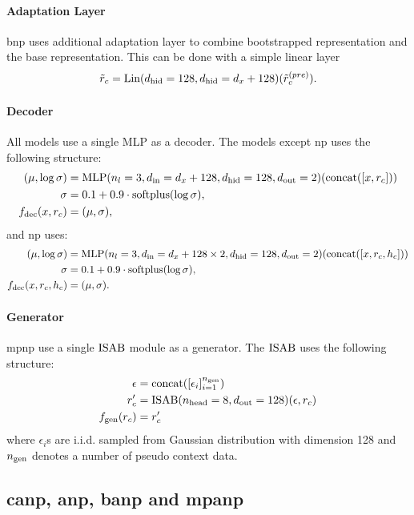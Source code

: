 \paragraph{Adaptation Layer}
\gls{bnp} uses additional adaptation layer to combine bootstrapped representation and the base representation. This can be done with a simple linear layer
\[
    \tilde{r}_c = \text{Lin}(d_{\text{hid}}=128, d_{\text{hid}}=d_x+128)(\tilde{r}_c^{(pre)}).
\]

\paragraph{Decoder}
All models use a single MLP as a decoder.
The models except \gls{np} uses the following structure:
\begin{align*}
    (\mu, \log \sigma) &= \text{MLP}(n_l=3, d_{\text{in}}=d_x + 128, d_{\text{hid}}=128, d_{\text{out}}=2)(\text{concat}([x,r_c])) \\
    \sigma &= 0.1 + 0.9 \cdot \text{softplus}(\log \sigma), \\
    f_\text{dec}(x, r_c) &= (\mu, \sigma),
\end{align*}
and \gls{np} uses:
\begin{align*}
    (\mu, \log \sigma) &= \text{MLP}(n_l=3, d_{\text{in}}=d_x + 128 \times 2, d_{\text{hid}}=128, d_{\text{out}}=2)(\text{concat}([x,r_c,h_c])) \\
    \sigma &= 0.1 + 0.9 \cdot \text{softplus}(\log \sigma), \\
    f_\text{dec}(x, r_c, h_c) &= (\mu, \sigma).
\end{align*}


\paragraph{Generator}
\gls{mpnp} use a single $\text{ISAB}$ module as a generator. The $\text{ISAB}$ uses the following structure: 
\begin{align*}
    \epsilon &= \text{concat}([\epsilon_i]_{i=1}^{n_{\text{gen}}})\\
    r_c' &= \text{ISAB}(n_{\text{head}}=8, d_{\text{out}}=128)(\epsilon,r_c)\\
    f_{\text{gen}}(r_c) &= r_c'
\end{align*}
where $\epsilon_i$s are i.i.d. sampled from Gaussian distribution with dimension 128 and $n_{\text{gen}}$ denotes a number of pseudo context data.

\subsection{\texorpdfstring{\gls{canp}, \gls{anp}, \gls{banp} and \gls{mpanp}}{CANP, ANP, BANP, NeuBANP, and MPANP}}


